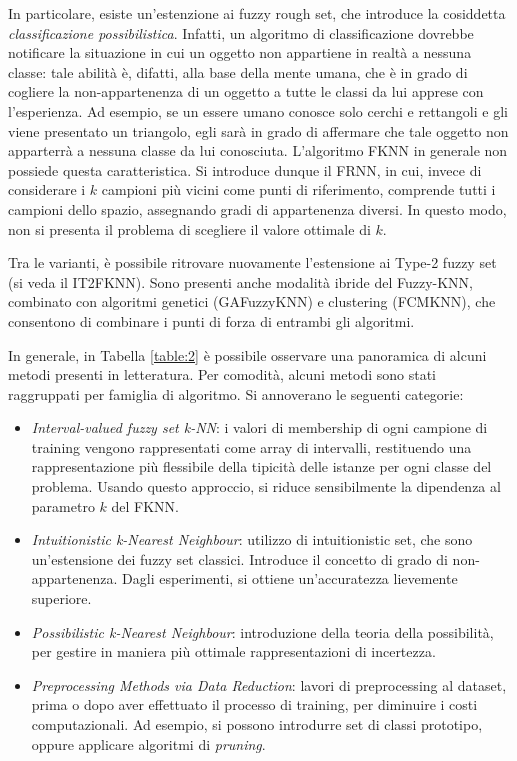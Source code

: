 \documentclass[11pt,  oneside, openany]{book}
\begin{document}
In particolare, esiste un'estenzione ai fuzzy rough set, che introduce la cosiddetta \textit{classificazione possibilistica}. Infatti, un algoritmo di classificazione dovrebbe notificare la situazione in cui un oggetto non appartiene in realtà a nessuna classe: tale abilità è, difatti, alla base della mente umana, che è in grado di cogliere la non-appartenenza di un oggetto a tutte le classi da lui apprese con l'esperienza. Ad esempio, se un essere umano conosce solo cerchi e rettangoli e gli viene presentato un triangolo, egli sarà in grado di affermare che tale oggetto non apparterrà a nessuna classe da lui conosciuta. L'algoritmo FKNN in generale non possiede questa caratteristica. Si introduce dunque il FRNN, in cui, invece di considerare i $k$ campioni più vicini come punti di riferimento, comprende tutti i campioni dello spazio, assegnando gradi di appartenenza diversi. In questo modo, non si presenta il problema di scegliere il valore ottimale di $k$. 

Tra le varianti, è possibile ritrovare nuovamente l'estensione ai Type-2 fuzzy set (si veda il IT2FKNN). Sono presenti anche modalità ibride del Fuzzy-KNN, combinato con algoritmi genetici (GAFuzzyKNN) e clustering (FCMKNN), che consentono di combinare i punti di forza di entrambi gli algoritmi. 

In generale, in Tabella \ref{table:2} è possibile osservare una panoramica di alcuni metodi presenti in letteratura. Per comodità, alcuni metodi sono stati raggruppati per famiglia di algoritmo. Si annoverano le seguenti categorie: 

\begin{itemize}
\item \textit{Interval-valued fuzzy set k-NN}: i valori di membership di ogni campione di training vengono rappresentati come array di intervalli, restituendo una rappresentazione più flessibile della tipicità delle istanze per ogni classe del problema. Usando questo approccio, si riduce sensibilmente la dipendenza al parametro $k$ del FKNN. 
\item \textit{Intuitionistic k-Nearest Neighbour}: utilizzo di intuitionistic set, che sono un'estensione dei fuzzy set classici. Introduce il concetto di grado di non-appartenenza. Dagli esperimenti, si ottiene un'accuratezza lievemente superiore. 
\item \textit{Possibilistic k-Nearest Neighbour}: introduzione della teoria della possibilità, per gestire in maniera più ottimale rappresentazioni di incertezza. 
\item \textit{Preprocessing Methods via Data Reduction}: lavori di preprocessing al dataset, prima o dopo aver effettuato il processo di training, per diminuire i costi computazionali. Ad esempio, si possono introdurre set di classi prototipo, oppure applicare algoritmi di \textit{pruning}.
\end{itemize}
\end{document}

